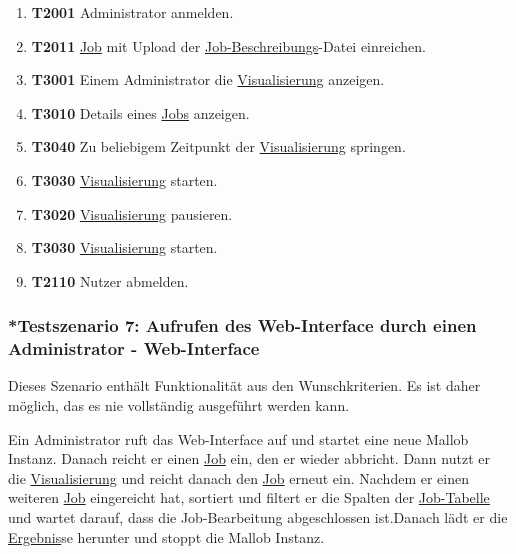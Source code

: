 \begin{enumerate}
    \item \textbf{T2001} \gls{Administrator} anmelden.
    
    \item \textbf{T2011} \hyperref[B:Jobs]{Job} mit Upload der \hyperref[B:Job-Beschreibung]{Job-Beschreibungs}-Datei einreichen.
    
    \item \textbf{T3001} Einem \gls{Administrator} die \hyperref[pages:visualization]{Visualisierung} anzeigen. 
    
    \item \textbf{T3010} Details eines  \hyperref[B:Jobs]{Jobs} anzeigen.
    
    \item \textbf{T3040} Zu beliebigem Zeitpunkt der \hyperref[pages:visualization]{Visualisierung} springen.
    
    \item \textbf{T3030} \hyperref[pages:visualization]{Visualisierung} starten. 
    
    \item \textbf{T3020} \hyperref[pages:visualization]{Visualisierung} pausieren. 
    
    \item \textbf{T3030} \hyperref[pages:visualization]{Visualisierung} starten. 
    
    \item \textbf{T2110} \gls{Nutzer} abmelden.
\end{enumerate}

\subsubsection{*Testszenario 7: Aufrufen des Web-Interface durch einen \gls{Administrator} - Web-Interface}
Dieses Szenario enthält Funktionalität aus den Wunschkriterien. Es ist daher möglich, das es nie vollständig ausgeführt werden kann. 

Ein \gls{Administrator} ruft das \gls{Web-Interface} auf und startet eine neue \gls{Mallob} Instanz. Danach reicht er einen \hyperref[B:Jobs]{Job} ein, den er wieder abbricht. Dann nutzt er die \hyperref[pages:visualization]{Visualisierung} und reicht danach den \hyperref[B:Jobs]{Job} erneut ein. Nachdem er einen weiteren \hyperref[B:Jobs]{Job} eingereicht hat, sortiert und filtert er die Spalten der \hyperref[pages:job-table]{Job-Tabelle} und wartet darauf, dass die Job-Bearbeitung abgeschlossen ist.Danach lädt er die \hyperref[B:Job-Ergebnis]{Ergebnis}se herunter und stoppt die \gls{Mallob} Instanz.

